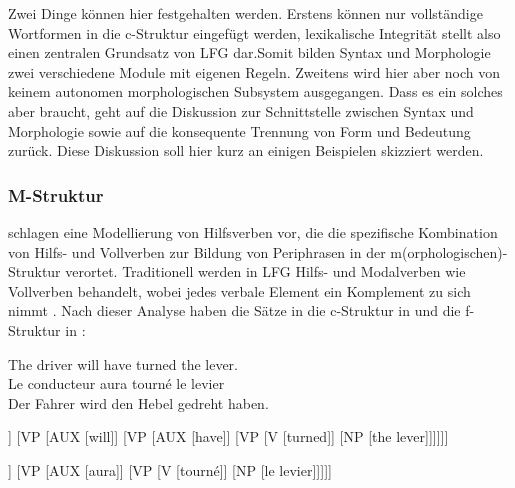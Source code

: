 Zwei Dinge können hier festgehalten werden. Erstens können nur vollständige Wortformen in die c-Struk\-tur eingefügt werden, lexikalische Integrität stellt also einen zentralen Grundsatz von LFG dar.\largerpage[2] Somit bilden Syntax und Morphologie zwei verschiedene Module mit eigenen Regeln. Zweitens wird hier aber noch von keinem autonomen morphologischen Subsystem ausgegangen. Dass es ein solches aber braucht, geht auf die Diskussion zur Schnittstelle zwischen Syntax und Morphologie sowie auf die konsequente Trennung von Form und Bedeutung zurück. Diese Diskussion soll hier kurz an einigen Beispielen skizziert werden.

\subsubsection{M-Struktur} \citet{ButtNiñoSegond2004} schlagen eine Modellierung von Hilfsverben vor, die die spezifische Kombination von Hilfs- und Vollverben zur Bildung von Periphrasen in der m(orphologischen)-Struktur verortet. Traditionell werden in LFG Hilfs- und Modalverben wie Vollverben behandelt, wobei jedes verbale Element ein Komplement zu sich nimmt \citep[13]{ButtNiñoSegond2004}. Nach dieser Analyse haben die Sätze in  die c-Struk\-tur in  und die f-Struk\-tur in  \citep[14–15]{ButtNiñoSegond2004}:\largerpage[2.5]

\ea%
    \label{ex:key:5}
The driver will have turned the lever.\\
Le conducteur aura tourné le levier\\
Der Fahrer wird den Hebel gedreht haben.\\
    \z


\ea%
    \label{ex:key:6}

{\small\begin{forest}
[S
	[NP [the driver]]
     [VP 
     [AUX [will]] 
     [VP
     [AUX [have]]
     [VP
     [V [turned]]
     [NP [the lever]]]]]]
\end{forest}

\begin{forest}
[S
	[NP [le conducteur]]
     [VP 
     [AUX [aura]] 
     [VP
     [V [tourné]]
     [NP [le levier]]]]]
\end{forest}}
\z

